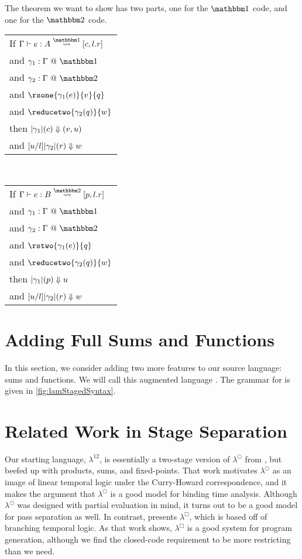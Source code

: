 \documentclass{article}
\begin{document}
The theorem we want to show has two parts, one for the $\bbone$ code, and one for the $\bbtwo$ code.  
\begin{center}
\begin{tabular}{l}
If $\splitone {e}{A}{c,l.r}$ \\
and $\colone {\gamma_1}{\Gamma}$ \\
and $\coltwo {\gamma_2}{\Gamma}$\\
and $\rsone{\gamma_1(e)}{v}{q}$ \\
and $\reducetwo{\gamma_2(q)}{w}$ \\
then ${|\gamma_1|(c)} \Downarrow {({v},{u})}$ \\
and ${[u/l]|\gamma_2|(r)} \Downarrow {w}$
\end{tabular}
~~~
\begin{tabular}{l}
If $\splittwo{e}{B}{p,l.r}$ \\
and $\colone {\gamma_1}{\Gamma}$ \\
and $\coltwo {\gamma_2}{\Gamma}$\\
and $\rstwo{\gamma_1(e)}{q}$ \\
and $\reducetwo{\gamma_2(q)}{w}$ \\
then ${|\gamma_1|(p)} \Downarrow {u}$ \\
and ${[u/l]|\gamma_2|(r)} \Downarrow {w}$ 
\end{tabular}
\end{center}


\section {Adding Full Sums and Functions}

In this section, we consider adding two more features to our source language: sums and functions.  We will call this augmented language \lamStaged.  The grammar for \lamStaged is given in \ref{fig:lamStagedSyntax}.



\section{Related Work in Stage Separation}

Our starting language, $\lambda^{12}$, is essentially a two-stage version of $\lambda^\bigcirc$ from \cite{davies96}, but beefed up with products, sums, and fixed-points.  That work motivates $\lambda^\bigcirc$ as an image of linear temporal logic under the Curry-Howard correspondence, and it makes the argument that $\lambda^\bigcirc$ is a good model for binding time analysis.  Although $\lambda^\bigcirc$ was designed with partial evaluation in mind, it turns out to be a good model for pass separation as well.  In contrast, \cite{davies01} presents $\lambda^\Box$, which is based off of branching temporal logic.  As that work shows, $\lambda^\Box$ is a good system for program generation, although we find the closed-code requirement to be more restricting than we need.
\end{document}
